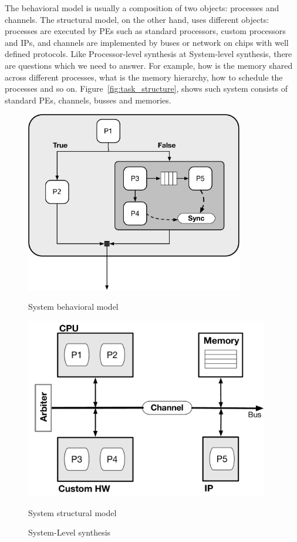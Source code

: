 The behavioral model is usually a composition of two objects: processes and channels.
The structural model, on the other hand, uses different objects: processes are executed by PEs such as standard processors, custom processors and IPs, and channels are implemented by buses or network on chips with well defined protocols.
Like Processor-level synthesis at System-level synthesis, there are questions which we need to answer.
For example, how is the memory shared across different processes, what is the memory hierarchy, how to schedule the processes and so on.
Figure~\ref{fig:task_structure}, shows such system consists of standard PEs, channels, busses and memories.

\begin{figure}[!h]
    \begin{minipage}{0.5\textwidth}
       \includegraphics[width=0.85\textwidth]{figures/Introduction/Task_Graph.pdf}
       \caption{System behavioral model}
       \label{fig:task_graph}
    \end{minipage}
    \begin{minipage}{0.5\textwidth}
       \includegraphics[width=0.95\textwidth]{figures/Introduction/system_synthesis.pdf}
       \caption{System structural model}
       \label{fig:task_structure}
    \end{minipage}
    \caption{System-Level synthesis}
    \label{fig:c_example}
\end{figure}



